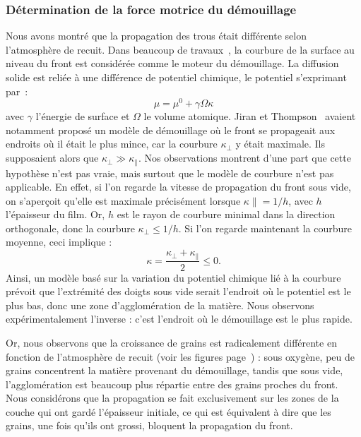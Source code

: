 			\subsubsection{Détermination de la force motrice du démouillage}
Nous avons montré que la propagation des trous était différente selon l’atmosphère de recuit. Dans beaucoup de travaux~\cite{presland1972hillock, jiran1990capillary, zucker2013model}, la courbure de la surface au niveau du front est considérée comme le moteur du démouillage. La diffusion solide est reliée à une différence de potentiel chimique, le potentiel s’exprimant par~:
\begin{equation}
\mu = \mu^0 +\gamma \Omega \kappa
\end{equation}
avec $\gamma$ l’énergie de surface et $\Omega$ le volume atomique. Jiran et Thompson~\cite{jiran1990capillary} avaient notamment proposé un modèle de démouillage où le front se propageait aux endroits où il était le plus mince, car la courbure $\kappa_\perp$ y était maximale. Ils supposaient alors que $\kappa_\perp \gg \kappa_\parallel$. Nos observations montrent d’une part que cette hypothèse n’est pas vraie, mais surtout que le modèle de courbure n’est pas applicable. En effet, si l’on regarde la vitesse de propagation du front sous vide, on s’aperçoit qu’elle est maximale précisément lorsque $\kappa\parallel = 1/h$, avec $h$ l’épaisseur du film. Or, $h$ est le rayon de courbure minimal dans la direction orthogonale, donc la courbure $\kappa_\perp\leq 1/h$. Si l’on regarde maintenant la courbure moyenne, ceci implique :
\begin{equation}
\kappa = \dfrac{\kappa_\perp+\kappa_\parallel}{2}\leq 0.
\end{equation}
Ainsi, un modèle basé sur la variation du potentiel chimique lié à la courbure prévoit que l’extrémité des doigts sous vide serait l’endroit où le potentiel est le plus bas, donc une zone d’agglomération de la matière. Nous observons expérimentalement l’inverse : c’est l’endroit où le démouillage est le plus rapide.\par 
{}
Or, nous observons que la croissance de grains est radicalement différente en fonction de l’atmosphère de recuit (voir les figures page~\pageref{MEBgrainsOx}) : sous oxygène, peu de grains concentrent la matière provenant du démouillage, tandis que sous vide, l’agglomération est beaucoup plus répartie entre des grains proches du front. Nous considérons que la propagation se fait exclusivement sur les zones de la couche qui ont gardé l’épaisseur initiale, ce qui est équivalent à dire que les grains, une fois qu’ils ont grossi, bloquent la propagation du front.\par 
